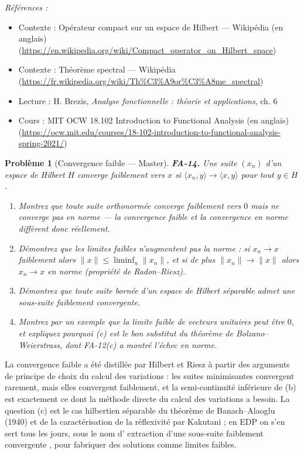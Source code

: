 \documentclass[11pt]{article}
\newtheorem{problem}{Problème}
\newenvironment{refs}{\par\small\noindent\emph{Références :}\begin{itemize}\setlength\itemsep{0pt}}{\end{itemize}\normalsize}
\begin{document}
\begin{refs}
\item Contexte : Opérateur compact sur un espace de Hilbert --- Wikipédia (en anglais) (\url{https://en.wikipedia.org/wiki/Compact_operator_on_Hilbert_space})
\item Contexte : Théorème spectral --- Wikipédia (\url{https://fr.wikipedia.org/wiki/Th%C3%A9or%C3%A8me_spectral})
\item Lecture : H. Brezis, \textit{Analyse fonctionnelle : théorie et applications}, ch. 6
\item Cours : MIT OCW 18.102 Introduction to Functional Analysis (en anglais) (\url{https://ocw.mit.edu/courses/18-102-introduction-to-functional-analysis-spring-2021/})
\end{refs}

\bigskip

\begin{problem}[{Convergence faible --- Master}]
\textbf{FA-14.} Une suite $ (x_n) $ d'un espace de Hilbert $ H $
\textit{converge faiblement} vers $ x $ si $ \langle x_n, y\rangle \to \langle x, y\rangle $ pour
tout $ y \in H $.
\begin{enumerate}
\item[(a)] Montrez que toute suite orthonormée converge faiblement vers $ 0 $ mais ne converge pas en
norme --- la convergence faible et la convergence en norme diffèrent donc réellement.
\item[(b)] Démontrez que les limites faibles n'augmentent pas la norme : si $ x_n \to x $ faiblement alors
$ \|x\| \le \liminf_n \|x_n\| $, et si de plus $ \|x_n\| \to \|x\| $ alors $ x_n \to x $ en
norme (propriété de Radon--Riesz).
\item[(c)] Démontrez que toute suite bornée d'un espace de Hilbert séparable admet une sous-suite faiblement
convergente.
\item[(d)] Montrez par un exemple que la limite faible de vecteurs unitaires peut être $ 0 $, et expliquez
pourquoi (c) est le bon substitut du théorème de Bolzano--Weierstrass, dont FA-12(c) a montré l'échec
en norme.
\end{enumerate}

\end{problem}

\noindent La convergence faible a été distillée par Hilbert et Riesz à partir des arguments de
\og{} principe de choix \fg{} du calcul des variations : les suites minimisantes convergent rarement, mais elles
convergent faiblement, et la semi-continuité inférieure de (b) est exactement ce dont la méthode directe
du calcul des variations a besoin. La question (c) est le cas hilbertien séparable du théorème de
Banach--Alaoglu (1940) et de la caractérisation de la réflexivité par Kakutani ; en EDP on s'en sert tous
les jours, sous le nom d'\og{} extraction d'une sous-suite faiblement convergente \fg{}, pour fabriquer des
solutions comme limites faibles.
\end{document}
